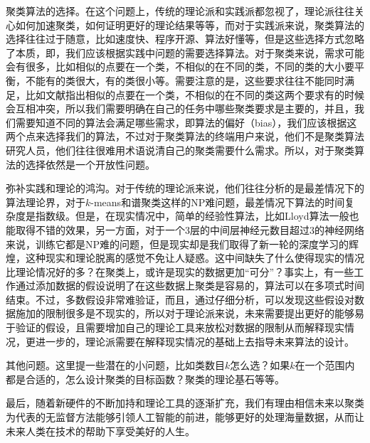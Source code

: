 聚类算法的选择。在这个问题上，传统的理论派和实践派都忽视了，理论派往往关心如何加速聚类，如何证明更好的理论结果等等，而对于实践派来说，聚类算法的选择往往过于随意，比如速度快、程序开源、算法好懂等，但是这些选择方式忽略了本质，即，我们应该根据实践中问题的需要选择算法。对于聚类来说，需求可能会有很多，比如相似的点要在一个类，不相似的在不同的类，不同的类的大小要平衡，不能有的类很大，有的类很小等。需要注意的是，这些要求往往不能同时满足，比如文献\cite{ben2018clustering}指出相似的点要在一个类，不相似的在不同的类这两个要求有的时候会互相冲突，所以我们需要明确在自己的任务中哪些聚类要求是主要的，并且，我们需要知道不同的算法会满足哪些需求，即算法的偏好（bias），我们应该根据这两个点来选择我们的算法，不过对于聚类算法的终端用户来说，他们不是聚类算法研究人员，他们往往很难用术语说清自己的聚类需要什么需求。所以，对于聚类算法的选择依然是一个开放性问题。

弥补实践和理论的鸿沟。对于传统的理论派来说，他们往往分析的是最差情况下的算法理论界，对于$k$-means和谱聚类这样的NP难问题，最差情况下算法的时间复杂度是指数级。但是，在现实情况中，简单的经验性算法，比如Lloyd算法一般也能取得不错的效果，另一方面，对于一个3层的中间层神经元数目超过3的神经网络来说，训练它都是NP难的问题，但是现实却是我们取得了新一轮的深度学习的辉煌，这种现实和理论脱离的感觉不免让人疑惑。这中间缺失了什么使得现实的情况比理论情况好的多？在聚类上，或许是现实的数据更加“可分”？事实上，有一些工作通过添加数据的假设说明了在这些数据上聚类是容易的，算法可以在多项式时间结束。不过，多数假设非常难验证，而且，通过仔细分析，可以发现这些假设对数据施加的限制很多是不现实的，所以对于理论派来说，未来需要提出更好的能够易于验证的假设，且需要增加自己的理论工具来放松对数据的限制从而解释现实情况，更进一步的，理论派需要在解释现实情况的基础上去指导未来算法的设计。

其他问题。这里提一些潜在的小问题，比如类数目$k$怎么选？如果$k$在一个范围内都是合适的，怎么设计聚类的目标函数？聚类的理论基石等等。

最后，随着新硬件的不断加持和理论工具的逐渐扩充，我们有理由相信未来以聚类为代表的无监督方法能够引领人工智能的前进，能够更好的处理海量数据，从而让未来人类在技术的帮助下享受美好的人生。
